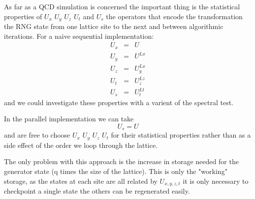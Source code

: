 \documentclass[12pt]{article}
\begin{document}
As far as a QCD simulation is concerned the important thing is the
statistical properties of $U_x$ $U_y$ $U_z$ $U_t$ and $U_s$ the operators that encode
the transformation the RNG state from one lattice site to the next and
between algorithmic iterations.
For a naive sequential implementation:
\begin{eqnarray}
  U_x &=& U \nonumber \\
  U_y &=& U^{Lx} \nonumber \\
  U_z &=& U_y^{Lx} \nonumber \\
  U_t &=& U_z^{Lz} \nonumber \\
  U_s &=& U_t^{Lt} \nonumber 
\end{eqnarray}
and we could investigate these properties with a varient of the
spectral test.

In the parallel implementation we can take
\begin{equation}
  U_s = U  
\end{equation}
and are free to choose $U_x$ $U_y$ $U_z$ $U_t$ for their statistical
properties rather than as a side effect of the order we loop through
the lattice.

The only problem with this approach is the increase in storage needed for the
generator state (q times the size of the lattice). This is only the
"working" storage, as the states at each site are all related by $U_{x,y,z,t}$
it is only necessary to checkpoint a single state the others can be
regenerated easily.
\end{document}
